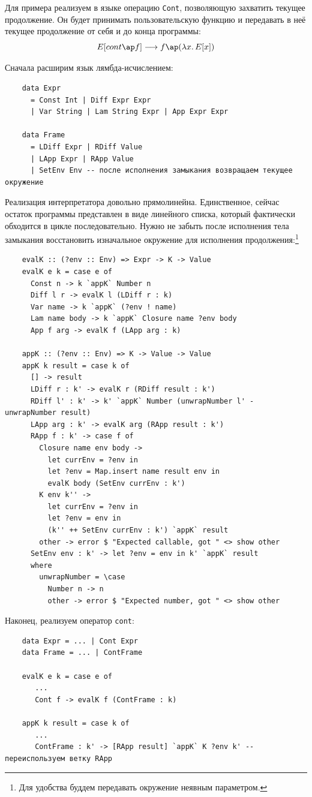 Для примера реализуем в языке операцию \texttt{Cont}, позволяющую захватить текущее продолжение.
Он будет принимать пользовательскую функцию и передавать в неё текущее продолжение от себя и до конца программы:
\[
    E[cont\ap f] \longrightarrow f\ap (\lambda x\ldotp E[x])
\]

Сначала расширим язык лямбда-исчислением:
\begin{verbatim}
    data Expr
      = Const Int | Diff Expr Expr
      | Var String | Lam String Expr | App Expr Expr

    data Frame
      = LDiff Expr | RDiff Value
      | LApp Expr | RApp Value
      | SetEnv Env -- после исполнения замыкания возвращаем текущее окружение
\end{verbatim}

Реализация интерпретатора довольно прямолинейна.
Единственное, сейчас остаток программы представлен в виде линейного списка, который фактически обходится в цикле последовательно.
Нужно не забыть после исполнения тела замыкания восстановить изначальное окружение для исполнения продолжения:\footnote{Для удобства буддем передавать окружение неявным параметром.}
\begin{verbatim}
    evalK :: (?env :: Env) => Expr -> K -> Value
    evalK e k = case e of
      Const n -> k `appK` Number n
      Diff l r -> evalK l (LDiff r : k)
      Var name -> k `appK` (?env ! name)
      Lam name body -> k `appK` Closure name ?env body
      App f arg -> evalK f (LApp arg : k)

    appK :: (?env :: Env) => K -> Value -> Value
    appK k result = case k of
      [] -> result
      LDiff r : k' -> evalK r (RDiff result : k')
      RDiff l' : k' -> k' `appK` Number (unwrapNumber l' - unwrapNumber result)
      LApp arg : k' -> evalK arg (RApp result : k')
      RApp f : k' -> case f of
        Closure name env body ->
          let currEnv = ?env in
          let ?env = Map.insert name result env in
          evalK body (SetEnv currEnv : k')
        K env k'' ->
          let currEnv = ?env in
          let ?env = env in
          (k'' ++ SetEnv currEnv : k') `appK` result
        other -> error $ "Expected callable, got " <> show other
      SetEnv env : k' -> let ?env = env in k' `appK` result
      where
        unwrapNumber = \case
          Number n -> n
          other -> error $ "Expected number, got " <> show other
\end{verbatim}

Наконец, реализуем оператор \texttt{cont}:
\begin{verbatim}
    data Expr = ... | Cont Expr
    data Frame = ... | ContFrame

    evalK e k = case e of
       ...
       Cont f -> evalK f (ContFrame : k)

    appK k result = case k of
       ...
       ContFrame : k' -> [RApp result] `appK` K ?env k' -- переиспользуем ветку RApp
\end{verbatim}

